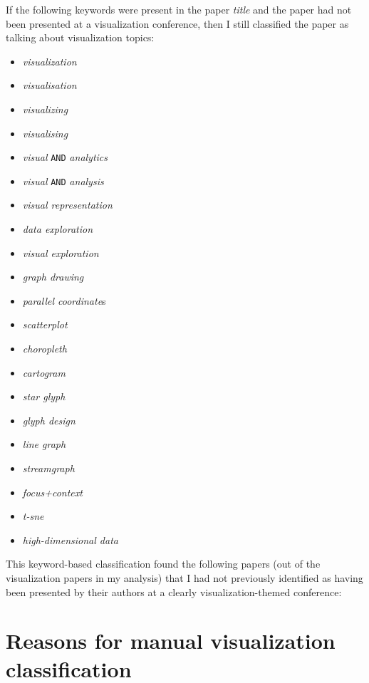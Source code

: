 \documentclass[conference,svgnames]{vgtc}                     %
\begin{document}
If the following keywords were present in the paper \emph{title} and the paper had not been presented at a visualization conference, then I still classified the paper as talking about visualization topics:
\begin{itemize}
\item \emph{visualization}
\item \emph{visualisation}
\item \emph{visualizing}
\item \emph{visualising}
\item \emph{visual} \texttt{AND} \emph{analytics}
\item \emph{visual} \texttt{AND} \emph{analysis}
\item \emph{visual representation}
\item \emph{data exploration}
\item \emph{visual exploration}
\item \emph{graph drawing}
\item \emph{parallel coordinate}s
\item \emph{scatterplot}
\item \emph{choropleth}
\item \emph{cartogram}
\item \emph{star glyph}
\item \emph{glyph design}
\item \emph{line graph}
\item \emph{streamgraph}
\item \emph{focus+context}
\item \emph{t-sne}
\item \emph{high-dimensional data}
\end{itemize}

This keyword-based classification found the following \GrsiVisByKeywordPapersCount{} papers (out of the \GrsiTotalVisPapers{} visualization papers in my analysis) that I had not previously identified as having been presented by their authors at a clearly visualization-themed conference:
\begin{itemize}

\end{itemize}


\section{Reasons for manual visualization classification}
\label{app:manual-reasons}
\end{document}
